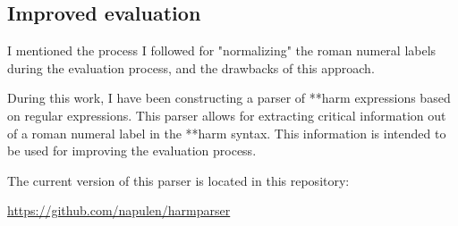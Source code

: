   \subsection{Improved evaluation}
    I mentioned the process I followed for "normalizing" the roman numeral labels during the evaluation process, and the drawbacks of this approach.

    During this work, I have been constructing a parser of **harm expressions based on regular expressions. This parser allows for extracting critical information out of a roman numeral label in the **harm syntax. This information is intended to be used for improving the evaluation process.

    The current version of this parser is located in this repository:

    \url{https://github.com/napulen/harmparser}

\newpage
